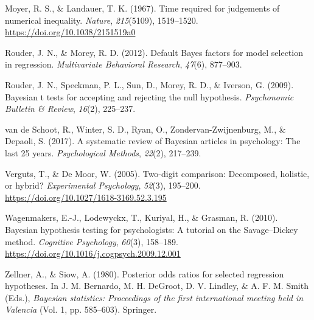 \documentclass[english,,doc,floatsintext]{apa6}
\begin{document}
\leavevmode\hypertarget{ref-moyer1967}{}%
Moyer, R. S., \& Landauer, T. K. (1967). Time required for judgements of numerical inequality. \emph{Nature}, \emph{215}(5109), 1519--1520. \url{https://doi.org/10.1038/2151519a0}

\leavevmode\hypertarget{ref-rouder2012defaultRegression}{}%
Rouder, J. N., \& Morey, R. D. (2012). Default Bayes factors for model selection in regression. \emph{Multivariate Behavioral Research}, \emph{47}(6), 877--903.

\leavevmode\hypertarget{ref-rouder2009bayesian}{}%
Rouder, J. N., Speckman, P. L., Sun, D., Morey, R. D., \& Iverson, G. (2009). Bayesian t tests for accepting and rejecting the null hypothesis. \emph{Psychonomic Bulletin \& Review}, \emph{16}(2), 225--237.

\leavevmode\hypertarget{ref-vandeschoot2017systematic}{}%
van de Schoot, R., Winter, S. D., Ryan, O., Zondervan-Zwijnenburg, M., \& Depaoli, S. (2017). A systematic review of Bayesian articles in psychology: The last 25 years. \emph{Psychological Methods}, \emph{22}(2), 217--239.

\leavevmode\hypertarget{ref-vergutsDeMoor2005}{}%
Verguts, T., \& De Moor, W. (2005). Two-digit comparison: Decomposed, holistic, or hybrid? \emph{Experimental Psychology}, \emph{52}(3), 195--200. \url{https://doi.org/10.1027/1618-3169.52.3.195}

\leavevmode\hypertarget{ref-wagenmakers2010}{}%
Wagenmakers, E.-J., Lodewyckx, T., Kuriyal, H., \& Grasman, R. (2010). Bayesian hypothesis testing for psychologists: A tutorial on the Savage--Dickey method. \emph{Cognitive Psychology}, \emph{60}(3), 158--189. \url{https://doi.org/10.1016/j.cogpsych.2009.12.001}

\leavevmode\hypertarget{ref-zellner1980posterior}{}%
Zellner, A., \& Siow, A. (1980). Posterior odds ratios for selected regression hypotheses. In J. M. Bernardo, M. H. DeGroot, D. V. Lindley, \& A. F. M. Smith (Eds.), \emph{Bayesian statistics: Proceedings of the first international meeting held in Valencia} (Vol. 1, pp. 585--603). Springer.
\end{document}
